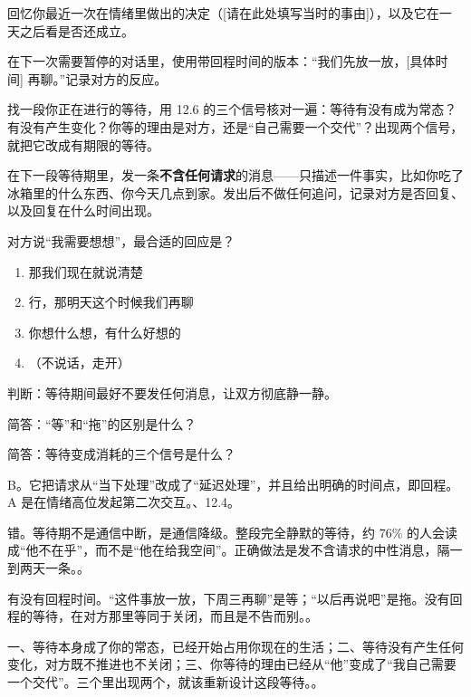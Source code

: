 \begin{exercisessec}
\item 回忆你最近一次在情绪里做出的决定（[请在此处填写当时的事由]），以及它在一天之后看是否还成立。

\item 在下一次需要暂停的对话里，使用带回程时间的版本：“我们先放一放，[具体时间] 再聊。”记录对方的反应。

\item 找一段你正在进行的等待，用 12.6 的三个信号核对一遍：等待有没有成为常态？有没有产生变化？你等的理由是对方，还是“自己需要一个交代”？出现两个信号，就把它改成有期限的等待。

\item 在下一段等待期里，发一条\textbf{不含任何请求}的消息——只描述一件事实，比如你吃了冰箱里的什么东西、你今天几点到家。发出后不做任何追问，记录对方是否回复、以及回复在什么时间出现。
\end{exercisessec}

\begin{quizsec}
\item 对方说“我需要想想”，最合适的回应是？

\begin{enumerate}[label=\Alph*., leftmargin=2.2em, labelsep=0.6em,
                  itemsep=0.2em, topsep=0.3em, parsep=0.1em]
\item 那我们现在就说清楚
\item 行，那明天这个时候我们再聊
\item 你想什么想，有什么好想的
\item （不说话，走开）
\end{enumerate}

\item 判断：等待期间最好不要发任何消息，让双方彻底静一静。

\item 简答：“等”和“拖”的区别是什么？

\item 简答：等待变成消耗的三个信号是什么？
\end{quizsec}

\begin{answerssec}
\item B。它把请求从“当下处理”改成了“延迟处理”，并且给出明确的时间点，即回程。A 是在情绪高位发起第二次交互。、12.4。

\item 错。等待期不是通信中断，是通信降级。整段完全静默的等待，约 76\% 的人会读成“他不在乎”，而不是“他在给我空间”。正确做法是发不含请求的中性消息，隔一到两天一条。。

\item 有没有回程时间。“这件事放一放，下周三再聊”是等；“以后再说吧”是拖。没有回程的等待，在对方那里等同于关闭，而且是不告而别。。

\item 一、等待本身成了你的常态，已经开始占用你现在的生活；二、等待没有产生任何变化，对方既不推进也不关闭；三、你等待的理由已经从“他”变成了“我自己需要一个交代”。三个里出现两个，就该重新设计这段等待。。
\end{answerssec}

